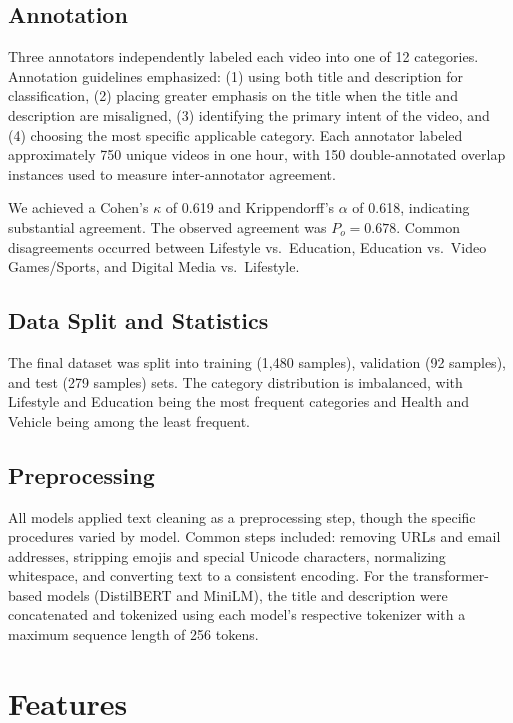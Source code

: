 \documentclass[11pt]{article}
\begin{document}
\subsection{Annotation}

Three annotators independently labeled each video into one of 12 categories. Annotation guidelines emphasized: (1) using both title and description for classification, (2) placing greater emphasis on the title when the title and description are misaligned, (3) identifying the primary intent of the video, and (4) choosing the most specific applicable category. Each annotator labeled approximately 750 unique videos in one hour, with 150 double-annotated overlap instances used to measure inter-annotator agreement.

We achieved a Cohen's $\kappa$ of 0.619 and Krippendorff's $\alpha$ of 0.618, indicating substantial agreement. The observed agreement was $P_o = 0.678$. Common disagreements occurred between Lifestyle vs.\ Education, Education vs.\ Video Games/Sports, and Digital Media vs.\ Lifestyle.

\subsection{Data Split and Statistics}

The final dataset was split into training (1,480 samples), validation (92 samples), and test (279 samples) sets. The category distribution is imbalanced, with Lifestyle and Education being the most frequent categories and Health and Vehicle being among the least frequent.

\subsection{Preprocessing}

All models applied text cleaning as a preprocessing step, though the specific procedures varied by model. Common steps included: removing URLs and email addresses, stripping emojis and special Unicode characters, normalizing whitespace, and converting text to a consistent encoding. For the transformer-based models (DistilBERT and MiniLM), the title and description were concatenated and tokenized using each model's respective tokenizer with a maximum sequence length of 256 tokens.

\section{Features}
\end{document}

